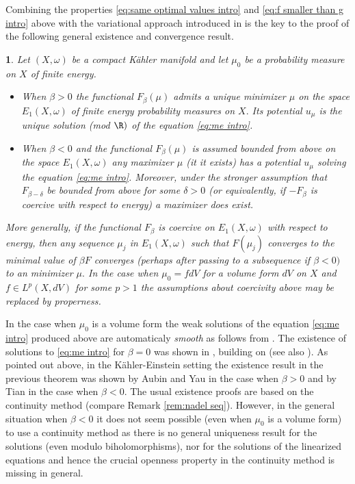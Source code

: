 \documentclass[11pt,oneside,english]{amsart}
\numberwithin{equation}{section}
\numberwithin{figure}{section}
\theoremstyle{plain}
\newtheorem{thm}{\protect\theoremname}[section]
\theoremstyle{plain}
\theoremstyle{plain}
\theoremstyle{plain}
\theoremstyle{remark}
\theoremstyle{definition}
\providecommand{\theoremname}{Theorem}
\begin{document}
Combining the properties \ref{eq:same optimal values intro} and \ref{eq:f smaller than g intro}
above with the variational approach introduced in \cite{begz} is
the key to the proof of the following general existence and convergence
result. 
\begin{thm}
\label{thm:main intro}Let $(X,\omega)$ be a compact Kähler manifold
and let $\mu_{0}$ be a probability measure on $X$ of finite energy. 
\begin{itemize}
\item When $\beta>0$ the   functional $F_{\beta}(\mu)$ admits a unique
\emph{minimizer }$\mu$ on the space $E_{1}(X,\omega)$ of finite
energy probability measures on $X.$ Its potential $u_{\mu}$ is the
unique solution (mod $\R)$ of the  equation \ref{eq:me intro}. 
\item When $\beta<0$ and the   functional $F_{\beta}(\mu)$ is assumed
bounded from above on the space $E_{1}(X,\omega)$ any maximizer $\mu$
(it it exists) has a potential $u_{\mu}$ solving the  equation \ref{eq:me intro}.
Moreover, under the stronger assumption that $F_{\beta-\delta}$ be
bounded from above for some $\delta>0$ (or equivalently, if $-F_{\beta}$
is coercive with respect to energy) a maximizer does exist. 
\end{itemize}
More generally, if the   functional $F_{\beta}$ is coercive on $E_{1}(X,\omega)$
with respect to energy, then any sequence $\mu_{j}$ in $E_{1}(X,\omega)$
such that $F(\mu_{j})$ converges to the minimal value of $\beta F$
converges (perhaps after passing to a subsequence if $\beta<0)$ to
an minimizer $\mu.$ In the case when $\mu_{0}=fdV$ for a volume
form $dV$ on $X$ and $f\in L^{p}(X,dV)$ for some $p>1$ the assumptions
about coercivity above may be replaced by properness.
\end{thm}
In the case when $\mu_{0}$ is a volume form the weak solutions of
the equation \ref{eq:me intro} produced above are automaticaly \emph{smooth}
as follows from \cite{ko,sz-to}. The existence of solutions to \ref{eq:me intro}
for $\beta=0$ was shown in \cite{g-z2}, building on \cite{y} (see
also \cite{begz}). As pointed out above, in the Kähler-Einstein setting
the existence result in the previous theorem was shown by Aubin and
Yau in the case when $\beta>0$ and by Tian in the case when $\beta<0.$
The usual existence proofs are based on the continuity method (compare
Remark \ref{rem:nadel seq}). However, in the general situation when
$\beta<0$ it does not seem possible (even when $\mu_{0}$ is a volume
form) to use a continuity method as there is no general uniqueness
result for the solutions (even modulo biholomorphisms), nor for the
solutions of the linearized equations and hence the crucial openness
property in the continuity method is missing in general.
\end{document}
